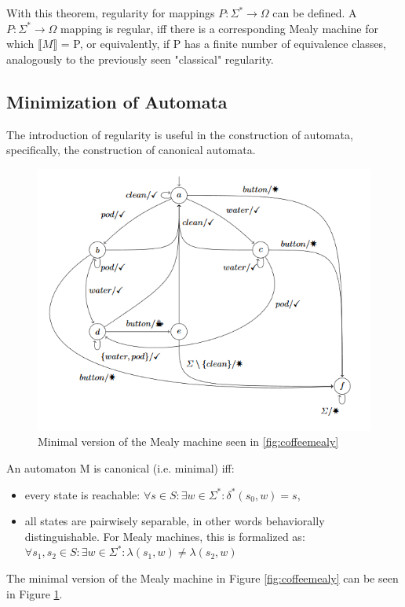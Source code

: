 With this theorem, regularity for mappings $P:\Sigma^*\to\Omega$ can be defined. A $P:\Sigma^*\to\Omega$ mapping is regular, iff there is a corresponding Mealy machine for which $\llbracket M\rrbracket$ = P, or equivalently, if P has a finite number of equivalence classes, analogously to the previously seen "classical" regularity.

\subsection{Minimization of Automata}

The introduction of regularity is useful in the construction of automata, specifically, the construction of canonical automata. 


\begin{figure}
	\centering
	\includegraphics[width=0.7\linewidth]{figures/coffeemealyminimal}
	\caption{Minimal version of the Mealy machine seen in \ref{fig:coffeemealy}}
	\label{fig:coffeemealyminimal}
\end{figure}


\begin{definition}
	An automaton M is canonical (i.e. minimal) iff:
	\begin{itemize}
		\item every state is reachable: $\forall s\in S: \exists w\in\Sigma^*: \delta^*(s_0, w) = s$,
		\item all states are pairwisely separable, in other words behaviorally distinguishable. For Mealy machines, this is formalized as: $\forall s_1, s_2\in S: \exists w\in\Sigma^*: \lambda(s_1, w)\neq\lambda(s_2, w)$
	\end{itemize}
\end{definition}

The minimal version of the Mealy machine in Figure \ref{fig:coffeemealy} can be seen in Figure \ref{fig:coffeemealyminimal}.


